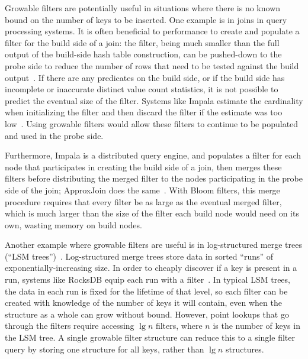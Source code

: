 \documentclass[letterpaper,twocolumn,10pt]{article}
\begin{document}
Growable filters are potentially useful in situations where there is no known bound on the number of keys to be inserted.
One example is in joins in query processing systems.
It is often beneficial to performance to create and populate a filter for the build side of a join:
the filter, being much smaller than the full output of the build-side hash table construction, can be pushed-down to the probe side to reduce the number of rows that need to be tested against the build output~\cite{tpch-filter}.
If there are any predicates on the build side, or if the build side has incomplete or inaccurate distinct value count statistics, it is not possible to predict the eventual size of the filter.
Systems like Impala estimate the cardinality when initializing the filter and then discard the filter if the estimate was too low~\cite{impala}.
Using growable filters would allow these filters to continue to be populated and used in the probe side.

Furthermore, Impala is a distributed query engine, and populates a filter for each node that participates in creating the build side of a join, then merges these filters before distributing the merged filter to the nodes participating in the probe side of the join; ApproxJoin does the same~\cite{approxjoin, impala}.
With Bloom filters, this merge procedure requires that every filter be as large as the eventual merged filter, which is much larger than the size of the filter each build node would need on its own, wasting memory on build nodes.

Another example where growable filters are useful is in log-structured merge trees (``LSM trees'')~\cite{lsm}.
Log-structured merge trees store data in sorted ``runs'' of exponentially-increasing size.
In order to cheaply discover if a key is present in a run, systems like RocksDB equip each run with a filter~\cite{lsm, ribbon}.
In typical LSM trees, the data in each run is fixed for the lifetime of that level, so each filter can be created with knowledge of the number of keys it will contain, even when the structure as a whole can grow without bound.
However, point lookups that go through the filters require accessing $\lg n$ filters, where $n$ is the number of keys in the LSM tree.
A single growable filter structure can reduce this to a single filter query by storing one structure for all keys, rather than $\lg n$ structures.

\end{document}
